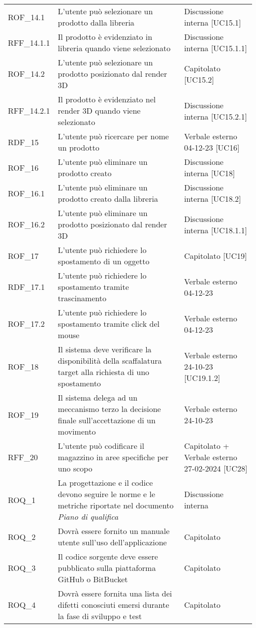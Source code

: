 \begin{xltabular}{\textwidth}{ p{0.2\textwidth} | X | p{0.2\textwidth} }
    ROF\_14.1& L'utente può selezionare un prodotto dalla libreria & Discussione interna [UC15.1]\\
    RFF\_14.1.1& Il prodotto è evidenziato in libreria quando viene selezionato & Discussione interna [UC15.1.1]\\
    ROF\_14.2& L'utente può selezionare un prodotto posizionato dal render 3D & Capitolato [UC15.2]\\
    RFF\_14.2.1& Il prodotto è evidenziato nel render 3D quando viene selezionato & Discussione interna [UC15.2.1]\\
    RDF\_15& L'utente può ricercare per nome un prodotto & Verbale esterno 04-12-23 [UC16]\\
    ROF\_16& L'utente può eliminare un prodotto creato & Discussione interna [UC18]\\
    ROF\_16.1& L'utente può eliminare un prodotto creato dalla libreria & Discussione interna [UC18.2]\\
    ROF\_16.2& L'utente può eliminare un prodotto posizionato dal render 3D & Discussione interna [UC18.1.1]\\
    ROF\_17& L'utente può richiedere lo spostamento di un oggetto & Capitolato [UC19]\\
    RDF\_17.1& L'utente può richiedere lo spostamento tramite trascinamento & Verbale esterno 04-12-23\\
    ROF\_17.2& L'utente può richiedere lo spostamento tramite click del mouse & Verbale esterno 04-12-23\\
    ROF\_18& Il sistema deve verificare la disponibilità della scaffalatura target alla richiesta di uno spostamento & Verbale esterno 24-10-23 [UC19.1.2]\\
    ROF\_19 & Il sistema delega ad un meccanismo terzo la decisione finale sull'accettazione di un movimento & Verbale esterno 24-10-23\\
    RFF\_20 & L'utente può codificare il magazzino in aree specifiche per uno scopo & Capitolato + Verbale esterno 27-02-2024 [UC28] \\
    ROQ\_1& La progettazione e il codice devono seguire le norme e le metriche riportate nel documento \textit{Piano di qualifica} & Discussione interna \\
    ROQ\_2& Dovrà essere fornito un manuale utente sull'uso dell'applicazione & Capitolato \\
    ROQ\_3& Il codice sorgente deve essere pubblicato sulla piattaforma GitHub o BitBucket & Capitolato \\
    ROQ\_4& Dovrà essere fornita una lista dei difetti conosciuti emersi durante la fase di sviluppo e test & Capitolato  \\

\end{xltabular}
